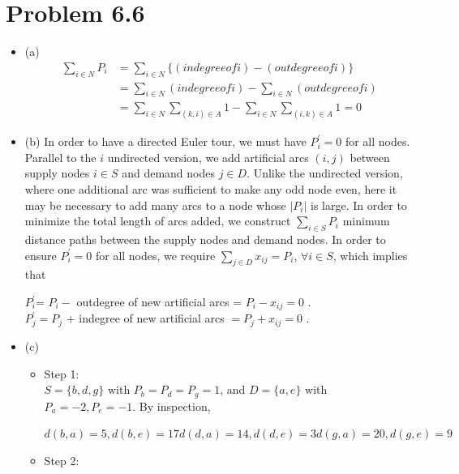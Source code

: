 \documentclass{article}
\theoremstyle{definition}
\theoremstyle{definition}
\theoremstyle{remark}
\begin{document}
\section*{Problem 6.6}
\begin{itemize}
	\item (a)
		\begin{equation*}
			\begin{aligned}
				\sum_{i \in N} P_i &= \sum_{i \in N} \{(indegree of i) - 
				(outdegree of i)\} \\
				&= \sum_{i \in N}(indegree of i) - \sum_{i \in N}(outdegree of i) \\
				&= \sum_{i \in N} \sum_{(k,i) \in A}1 - \sum_{i \in N} \sum_{(i,k) \in A}1 = 0
			\end{aligned}
		\end{equation*}
	\item (b) 
	In order to have a directed Euler tour, we must have $P_{i}^{'} =0$ for all nodes. Parallel to the $i$
	undirected version, we add artificial arcs $(i, j)$ between supply nodes $i \in S$ and demand nodes
	$j\in D$. Unlike the undirected version, where one additional arc was sufficient to make any
	odd node even, here it may be necessary to add many arcs to a node whose $|P_i|$ is large. In
	order to minimize the total length of arcs added, we construct $\sum_{i \in S}P_i$ minimum distance 
	paths between the supply nodes and demand nodes. In order to ensure $P_{i}^{'}=0$ for all nodes,
	we require $\sum_{j \in D} x_{ij} = P_i$, $\forall i \in S$, which implies that \\
	\begin{center}
		$P_{i}^{'}$= $P_i - $  outdegree of new artificial arcs = $P_i - x_{ij} = 0$ . \\
		$P_{j}^{'} = P_j$ + indegree of new artificial arcs $= P_j + x_{ij} = 0$ .
	\end{center}
	\item (c)
		\begin{itemize}
			\item Step 1: \\
			$S = \{b, d, g\}$ with $P_b = P_d = P_g =1$, and $D = \{a, e\}$ 
			with $P_a = -2, P_e = -1$. By inspection, \\
			\begin{center}
				$d(b, a)=5, d(b, e) = 17
				d(d, a) = 14, d(d, e)=3
				d(g,a) = 20, d(g,e)=9$
			\end{center}
			\item Step 2: \\
			\begin{equation*}

\end{equation*}
\end{itemize}
\end{itemize}
\end{document}
